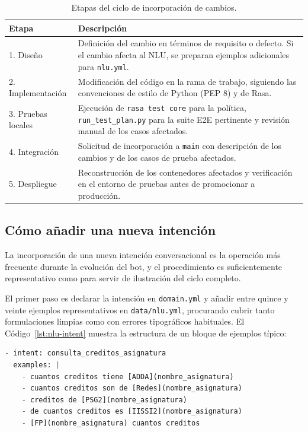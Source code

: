 \begin{table}[hbtp]
\centering
\caption{Etapas del ciclo de incorporación de cambios.}\label{tab:desarrollo-ciclo}
\begin{tabular}{p{3.5cm}p{9cm}}
\hline
\textbf{Etapa} & \textbf{Descripción} \\
\hline
1. Diseño & Definición del cambio en términos de requisito o defecto. Si el cambio afecta al NLU, se preparan ejemplos adicionales para \texttt{nlu.yml}. \\
2. Implementación & Modificación del código en la rama de trabajo, siguiendo las convenciones de estilo de Python (PEP 8) y de Rasa. \\
3. Pruebas locales & Ejecución de \texttt{rasa test core} para la política, \texttt{run\_test\_plan.py} para la suite E2E pertinente y revisión manual de los casos afectados. \\
4. Integración & Solicitud de incorporación a \texttt{main} con descripción de los cambios y de los casos de prueba afectados. \\
5. Despliegue & Reconstrucción de los contenedores afectados y verificación en el entorno de pruebas antes de promocionar a producción. \\
\hline
\end{tabular}
\end{table}

\subsection{Cómo añadir una nueva intención}\label{subsec:desarrollo-intencion}

La incorporación de una nueva intención conversacional es la operación más frecuente durante la evolución del bot, y el procedimiento es suficientemente representativo como para servir de ilustración del ciclo completo.

El primer paso es declarar la intención en \texttt{domain.yml} y añadir entre quince y veinte ejemplos representativos en \texttt{data/nlu.yml}, procurando cubrir tanto formulaciones limpias como con errores tipográficos habituales. El Código~\ref{lst:nlu-intent} muestra la estructura de un bloque de ejemplos típico:

\begin{lstlisting}[language=python, caption={Declaracion de una intencion con ejemplos NLU en \texttt{data/nlu.yml}.}, label={lst:nlu-intent}]
- intent: consulta_creditos_asignatura
  examples: |
    - cuantos creditos tiene [ADDA](nombre_asignatura)
    - cuantos creditos son de [Redes](nombre_asignatura)
    - creditos de [PSG2](nombre_asignatura)
    - de cuantos creditos es [IISSI2](nombre_asignatura)
    - [FP](nombre_asignatura) cuantos creditos
\end{lstlisting}

